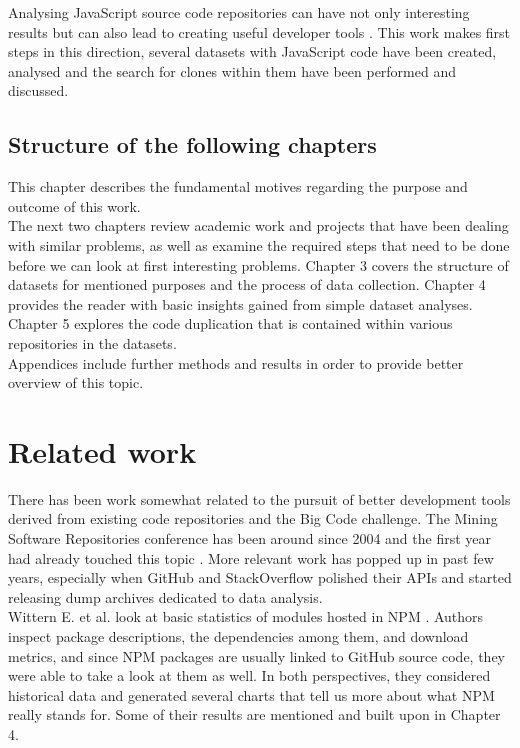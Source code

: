 \documentclass[thesis=M,english]{FITthesis}[2012/10/20]
\begin{document}
Analysing JavaScript source code repositories can have not only interesting results but can also lead to creating useful developer tools \cite{jsnice, darpa}. This work makes first steps in this direction, several datasets with JavaScript code have been created, analysed and the search for clones within them have been performed and discussed.


\section{Structure of the following chapters}

This chapter describes the fundamental motives regarding the purpose and outcome of this work. \\

The next two chapters review academic work and projects that have been dealing with similar problems, as well as examine the required steps that need to be done before we can look at first interesting problems. Chapter 3 covers the structure of datasets for mentioned purposes and the process of data collection. Chapter 4 provides the reader with basic insights  gained from simple dataset analyses. Chapter 5 explores the code duplication that is contained within various repositories in the datasets. \\

Appendices include further methods and results in order to provide better overview of this topic.

\chapter{Related work}

There has been work somewhat related to the pursuit of better development tools derived from existing code repositories and the Big Code challenge. The Mining Software Repositories conference has been around since 2004 \cite{msr_1} and the first year had already touched this topic \cite{msr_2}. More relevant work has popped up in past few years, especially when GitHub and StackOverflow polished their APIs and started releasing dump archives dedicated to data analysis. \\


Wittern E. et al. look at basic statistics of modules hosted in NPM \cite{js_dynamics}. Authors inspect package descriptions, the dependencies among them, and download metrics, and since NPM packages are usually linked to GitHub source code, they were able to take a look at them as well. In both perspectives, they considered historical data and generated several charts that tell us more about what NPM really stands for. Some of their results are mentioned and built upon in Chapter 4. \\
\end{document}
